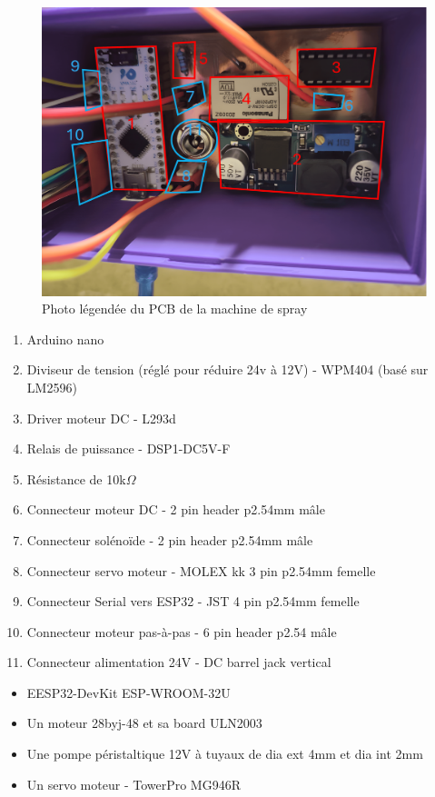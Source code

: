 \begin{figure}[H]
    \centering
    \includegraphics[width = \textwidth, trim = {0 20cm 0 0}, clip]{assets/figures/ameliorations/PCB_machine_spray.png}
    \caption{Photo légendée du PCB de la machine de spray}
\end{figure}
\begin{enumerate}
    \item Arduino nano
    \item Diviseur de tension (réglé pour réduire 24v à 12V) - WPM404 (basé sur LM2596)
    \item Driver moteur DC - L293d
    \item Relais de puissance - DSP1-DC5V-F
    \item Résistance de 10k$\Omega$
    \item Connecteur moteur DC - 2 pin header p2.54mm mâle
    \item Connecteur solénoïde - 2 pin header p2.54mm mâle
    \item Connecteur servo moteur - MOLEX kk 3 pin p2.54mm femelle
    \item Connecteur Serial vers ESP32 - JST 4 pin p2.54mm femelle
    \item Connecteur moteur pas-à-pas - 6 pin header p2.54 mâle
    \item Connecteur alimentation 24V - DC barrel jack vertical
\end{enumerate}
\begin{itemize}
    \item EESP32-DevKit ESP-WROOM-32U
    \item Un moteur 28byj-48 et sa board ULN2003
    \item Une pompe péristaltique 12V à tuyaux de dia ext 4mm et dia int 2mm
    \item Un servo moteur - TowerPro MG946R
\end{itemize}

